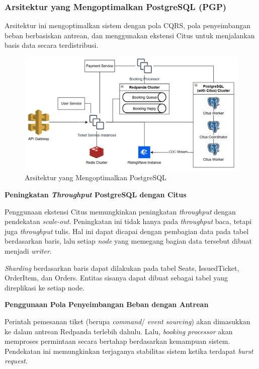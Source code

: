 \subsubsection{Arsitektur yang Mengoptimalkan PostgreSQL (PGP)}

Arsitektur ini mengoptimalkan sistem dengan pola CQRS, pola penyeimbangan beban berbasiskan antrean, dan menggunakan ekstensi Citus untuk menjalankan basis data secara terdistribusi.

\begin{figure}[htbp]
    \centering
    \includegraphics[width=1\textwidth]{resources/appendix/architecture-optimized.png}
    \caption{Arsitektur yang Mengoptimalkan PostgreSQL}
    \label{fig:optimized-architecture}
\end{figure}

\textbf{Peningkatan \textit{Throughput} PostgreSQL dengan Citus}

Penggunaan ekstensi Citus memungkinkan peningkatan \textit{throughput} dengan pendekatan \textit{scale-out}. Peningkatan ini tidak hanya pada \textit{throughput} baca, tetapi juga \textit{throughput} tulis. Hal ini dapat dicapai dengan pembagian data pada tabel berdasarkan baris, lalu setiap \textit{node} yang memegang bagian data tersebut dibuat menjadi \textit{writer}.

\textit{Sharding} berdasarkan baris dapat dilakukan pada tabel Seats, IssuedTicket, OrderItem, dan Orders. Entitas sisanya dapat dibuat sebagai tabel yang direplikasi ke setiap node.

\textbf{Penggunaan Pola Penyeimbangan Beban dengan Antrean}

Perintah pemesanan tiket (berupa \textit{command}/ \textit{event sourcing}) akan dimasukkan ke dalam antrean Redpanda terlebih dahulu. Lalu, \textit{booking processor} akan memproses permintaan secara bertahap berdasarkan kemampuan sistem. Pendekatan ini memungkinkan terjaganya stabilitas sistem ketika terdapat \textit{burst request}.

